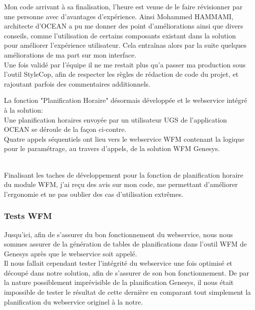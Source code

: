 \documentclass{rapport}
\begin{document}
Mon code arrivant à sa finalisation, l'heure est venue de le faire révisionner par une personne avec d'avantages d'expérience. Ainsi Mohammed HAMMAMI, architecte d'OCEAN a pu me donner des point d'améliorations ainsi que divers conseils, comme l'utilisation de certains composants existant dans la solution pour améliorer l'expérience utilisateur. Cela entraînas alors par la suite quelques améliorations de ma part sur mon interface.\\

Une fois validé par l'équipe il ne me restait plus qu'a passer ma production sous l'outil StyleCop, afin de respecter les règles de rédaction de code du projet, et rajoutant parfois des commentaires additionnels.\\

\begin{minipage}{0.55\textwidth}
\end{minipage}
\begin{minipage}{0.35\textwidth}
La fonction "Planification Horaire" désormais développée et le webservice intégré à la solution:\\

Une planification horaires envoyée par un utilisateur UGS de l'application OCEAN se déroule de la façon ci-contre.\\

Quatre appels séquentiels ont lieu vers le webservice WFM contenant la logique pour le paramétrage, au travers d'appels, de la solution WFM Genesys.

\end{minipage}
\vspace{5mm} %
\\

Finalisant les taches de développement pour la fonction de planification horaire du module WFM, j'ai reçu des avis sur mon code, me permettant d'améliorer l'ergonomie et ne pas oublier des cas d'utilisation extrêmes.

\subsubsection{Tests WFM}

Jusqu'ici, afin de s'assurer du bon fonctionnement du webservice, nous nous sommes assurer de la génération de tables de planifications dans l'outil WFM de Genesys après que le webservice soit appelé.\\
Il nous fallait cependant tester l'intégrité du webservice une fois optimisé et découpé dans notre solution, afin de s'assurer de son bon fonctionnement. De par la nature possiblement imprévisible de la planification Genesys, il nous était impossible de tester le résultat de cette dernière en comparant tout simplement la planification du webservice originel à la notre.\\
\end{document}
